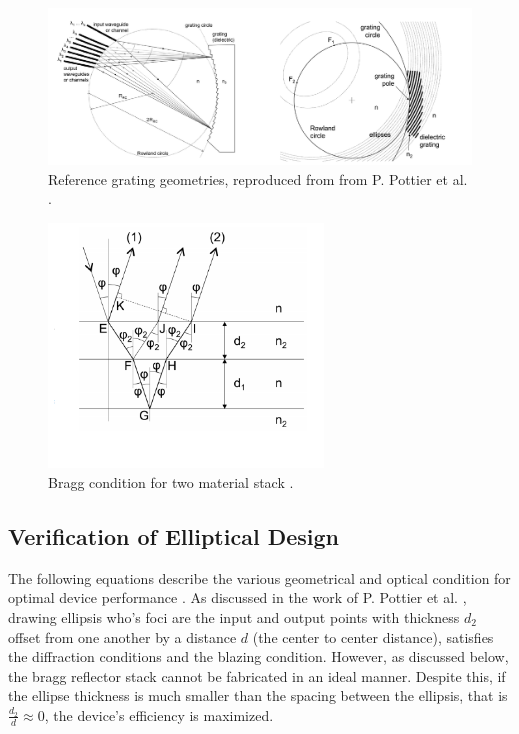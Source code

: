 \documentclass{article}
\begin{document}
\begin{figure}[H]        
\centering
\scriptsize 
\includegraphics[width=0.9 \textwidth]{images/pottier.png}
\caption{\label{fig:pot_ref} Reference grating geometries, reproduced from from P. Pottier et al. \cite{Packirisamy2012Mono-OrderGrating}.}
\end{figure}

\begin{figure}[H]
\centering
\includegraphics[width=0.65\textwidth]{images/bragg_cond.png}
\caption{ Bragg condition for two material stack \cite{Packirisamy2012Mono-OrderGrating}.}
\label{fig:nanos_test_code0}
\end{figure}

\subsection{Verification of Elliptical Design}
The following equations describe the various geometrical and optical condition for optimal device performance \cite{Packirisamy2012Mono-OrderGrating,Pottier2014IntegratedInsulator}. As discussed in the work of P. Pottier et al. \cite{Packirisamy2012Mono-OrderGrating}, drawing ellipsis who's foci are the input and output points with thickness $d_2$ offset from one another by a distance $d$ (the center to center distance), satisfies the diffraction conditions and the blazing condition. However, as discussed below, the bragg reflector stack cannot be fabricated in an ideal manner. Despite this, if the ellipse thickness is much smaller than the spacing between the ellipsis, that is $\frac{d_2}{d} \approx 0$, the device's efficiency is maximized.
\end{document}
